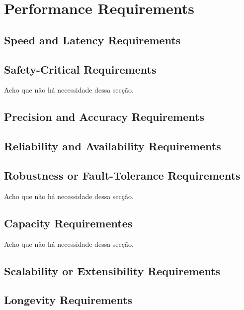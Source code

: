 \chapter{Performance Requirements}

\section{Speed and Latency Requirements}

\section{Safety-Critical Requirements}
Acho que não há necessidade dessa secção.

\section{Precision and Accuracy Requirements}

\section{Reliability and Availability Requirements}

\section{Robustness or Fault-Tolerance Requirements}
Acho que não há necessidade dessa secção.

\section{Capacity Requirementes}
Acho que não há necessidade dessa secção.

\section{Scalability or Extensibility Requirements}

\section{Longevity Requirements}